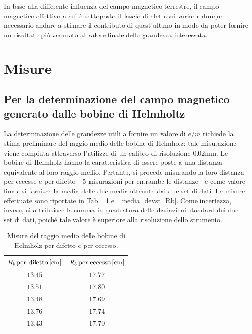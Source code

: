 \documentclass[]{article}
\let\oldsection\section%
\renewcommand{\section}{%
	\renewcommand{\theequation}{\thesection.\arabic{equation}}%
	\oldsection}%
\let\oldsubsection\subsection%
\renewcommand{\subsection}{%
	\renewcommand{\theequation}{\thesubsection.\arabic{equation}}%
	\oldsubsection}%
\begin{document}
    In base alla differente influenza del campo magnetico terrestre, il campo magnetico effettivo a cui è sottoposto il fascio di elettroni varia: è dunque necessario andare a stimare il contributo di quest'ultimo in modo da poter fornire un risultato più accurato al valore finale della grandezza interessata.

    \section{Misure}

    \subsection{Per la determinazione del campo magnetico generato dalle bobine di Helmholtz}

    La determinazione delle grandezze utili a fornire un valore di $e/m$ richiede la stima preliminare del raggio medio delle bobine di Helmholz: tale misurazione viene compiuta attraverso l'utilizzo di un calibro di risoluzione $0.02 \text{mm}$. Le bobine di Helmholz hanno la caratteristica di essere poste a una distanza equivalente al loro raggio medio. Pertanto, si procede misurando la loro distanza per eccesso e per difetto - 5 misurazioni per entrambe le distanze - e come valore finale si fornisce la media delle due medie ottenute dai due set di dati. Le misure effettuate sono riportate in Tab. ~\ref{Raggio_bobine} e ~\ref{media_devst_Rb}. Come incertezza, invece, si attribuisce la somma in quadratura delle deviazioni standard dei due set di dati, poiché tale valore è superiore alla risoluzione dello strumento.


    \begin{table}[H]
        \centering
    
        \begin{tabular}{||c|c||}
            \hline
            $R_b \, \text{per difetto\,} \text{[cm]} $ & $R_b \, \text{per eccesso\,} \text{[cm]} $\\
            \hline\hline
    
            $ 13.45 $ & $ 17.77 $ \\\hline
            $ 13.51 $ & $ 17.80 $ \\\hline
            $ 13.48 $ & $ 17.69 $ \\\hline
            $ 13.76 $ & $ 17.74 $ \\\hline
            $ 13.43 $ & $ 17.70 $ \\\hline
        
        \end{tabular}
        \caption{Misure del raggio medio delle bobine di Helmholz per difetto e per eccesso.}
        \label{Raggio_bobine}
    \end{table}
    
\end{document}
